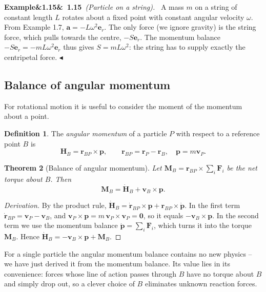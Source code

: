 \documentclass[11pt,a4paper,oneside]{report}
\numberwithin{equation}{chapter}
\newcommand{\vect}[1]{\bm{#1}}
\newcommand{\e}[1]{\vect{e}_{#1}}
\theoremstyle{plain}
\newtheorem{theorem}{Theorem}[chapter]
\theoremstyle{definition}
\newtheorem{definition}[theorem]{Definition}
\theoremstyle{remark}
\newenvironment{example}[2]{%
  \par\addvspace{\bigskipamount}\noindent
  \textbf{Example\ifx&#1&\else~#1\fi}\ \textit{(#2).}\ \ignorespaces}%
  {\hfill$\blacktriangleleft$\par\addvspace{\bigskipamount}}
\begin{document}
\begin{example}{1.15}{Particle on a string}
A mass $m$ on a string of constant length $L$ rotates about a fixed point with constant angular velocity $\omega$.
From Example 1.7, $\vect a=-L\omega^2\e r$. The only force (we ignore gravity) is the string force, which pulls
towards the centre, $-S\e r$. The momentum balance $-S\e r=-mL\omega^2\e r$ thus gives $S=mL\omega^2$: the string
has to supply exactly the centripetal force.
\end{example}

\subsection{Balance of angular momentum}
For rotational motion it is useful to consider the moment of the momentum about a point.

\begin{definition}
The \emph{angular momentum} of a particle $P$ with respect to a reference point $B$ is
\begin{equation}
  \vect H_B=\vect r_{BP}\times\vect p,\qquad\vect r_{BP}=\vect r_P-\vect r_B,\quad\vect p=m\vect v_P .
\end{equation}
\end{definition}

\begin{theorem}[Balance of angular momentum]
Let $\vect M_B=\vect r_{BP}\times\sum_i\vect F_i$ be the net torque about $B$. Then
\begin{equation}\label{eq:amb-particle}
  \vect M_B=\dot{\vect H}_B+\vect v_B\times\vect p .
\end{equation}
\end{theorem}
\begin{proof}[Derivation]
By the product rule, $\dot{\vect H}_B=\dot{\vect r}_{BP}\times\vect p+\vect r_{BP}\times\dot{\vect p}$. In the
first term $\dot{\vect r}_{BP}=\vect v_P-\vect v_B$, and $\vect v_P\times\vect p=m\,\vect v_P\times\vect v_P=\vect 0$,
so it equals $-\vect v_B\times\vect p$. In the second term we use the momentum balance $\dot{\vect p}=\sum_i\vect F_i$,
which turns it into the torque $\vect M_B$. Hence $\dot{\vect H}_B=-\vect v_B\times\vect p+\vect M_B$.
\end{proof}

For a single particle the angular momentum balance contains no new physics -- we have just derived it from the
momentum balance. Its value lies in its convenience: forces whose line of action passes through $B$ have no torque
about $B$ and simply drop out, so a clever choice of $B$ eliminates unknown reaction forces.
\end{document}
